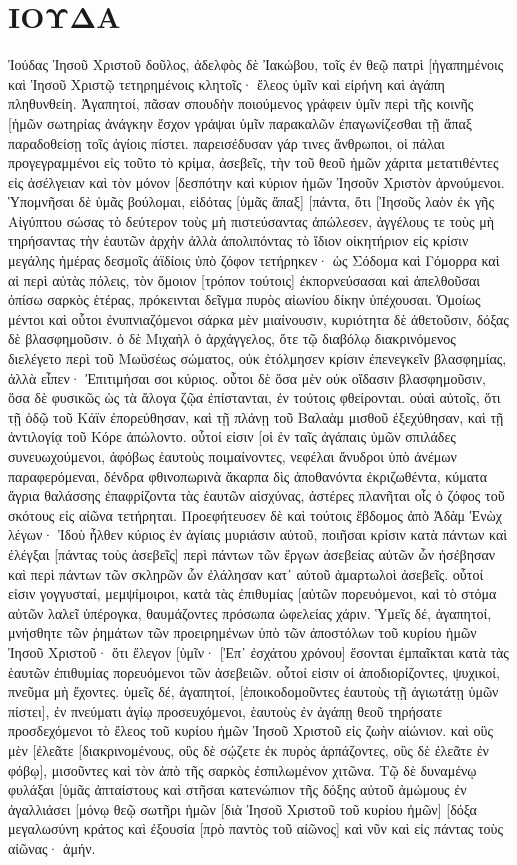 \section{ΙΟΥΔΑ}
Ἰούδας Ἰησοῦ Χριστοῦ δοῦλος, ἀδελφὸς δὲ Ἰακώβου, τοῖς ἐν θεῷ πατρὶ [ἠγαπημένοις καὶ Ἰησοῦ Χριστῷ τετηρημένοις κλητοῖς· 
ἔλεος ὑμῖν καὶ εἰρήνη καὶ ἀγάπη πληθυνθείη. 
Ἀγαπητοί, πᾶσαν σπουδὴν ποιούμενος γράφειν ὑμῖν περὶ τῆς κοινῆς [ἡμῶν σωτηρίας ἀνάγκην ἔσχον γράψαι ὑμῖν παρακαλῶν ἐπαγωνίζεσθαι τῇ ἅπαξ παραδοθείσῃ τοῖς ἁγίοις πίστει. 
παρεισέδυσαν γάρ τινες ἄνθρωποι, οἱ πάλαι προγεγραμμένοι εἰς τοῦτο τὸ κρίμα, ἀσεβεῖς, τὴν τοῦ θεοῦ ἡμῶν χάριτα μετατιθέντες εἰς ἀσέλγειαν καὶ τὸν μόνον [δεσπότην καὶ κύριον ἡμῶν Ἰησοῦν Χριστὸν ἀρνούμενοι. 
Ὑπομνῆσαι δὲ ὑμᾶς βούλομαι, εἰδότας [ὑμᾶς ἅπαξ] [πάντα, ὅτι [Ἰησοῦς λαὸν ἐκ γῆς Αἰγύπτου σώσας τὸ δεύτερον τοὺς μὴ πιστεύσαντας ἀπώλεσεν, 
ἀγγέλους τε τοὺς μὴ τηρήσαντας τὴν ἑαυτῶν ἀρχὴν ἀλλὰ ἀπολιπόντας τὸ ἴδιον οἰκητήριον εἰς κρίσιν μεγάλης ἡμέρας δεσμοῖς ἀϊδίοις ὑπὸ ζόφον τετήρηκεν· 
ὡς Σόδομα καὶ Γόμορρα καὶ αἱ περὶ αὐτὰς πόλεις, τὸν ὅμοιον [τρόπον τούτοις] ἐκπορνεύσασαι καὶ ἀπελθοῦσαι ὀπίσω σαρκὸς ἑτέρας, πρόκεινται δεῖγμα πυρὸς αἰωνίου δίκην ὑπέχουσαι. 
Ὁμοίως μέντοι καὶ οὗτοι ἐνυπνιαζόμενοι σάρκα μὲν μιαίνουσιν, κυριότητα δὲ ἀθετοῦσιν, δόξας δὲ βλασφημοῦσιν. 
ὁ δὲ Μιχαὴλ ὁ ἀρχάγγελος, ὅτε τῷ διαβόλῳ διακρινόμενος διελέγετο περὶ τοῦ Μωϋσέως σώματος, οὐκ ἐτόλμησεν κρίσιν ἐπενεγκεῖν βλασφημίας, ἀλλὰ εἶπεν· Ἐπιτιμήσαι σοι κύριος. 
οὗτοι δὲ ὅσα μὲν οὐκ οἴδασιν βλασφημοῦσιν, ὅσα δὲ φυσικῶς ὡς τὰ ἄλογα ζῷα ἐπίστανται, ἐν τούτοις φθείρονται. 
οὐαὶ αὐτοῖς, ὅτι τῇ ὁδῷ τοῦ Κάϊν ἐπορεύθησαν, καὶ τῇ πλάνῃ τοῦ Βαλαὰμ μισθοῦ ἐξεχύθησαν, καὶ τῇ ἀντιλογίᾳ τοῦ Κόρε ἀπώλοντο. 
οὗτοί εἰσιν [οἱ ἐν ταῖς ἀγάπαις ὑμῶν σπιλάδες συνευωχούμενοι, ἀφόβως ἑαυτοὺς ποιμαίνοντες, νεφέλαι ἄνυδροι ὑπὸ ἀνέμων παραφερόμεναι, δένδρα φθινοπωρινὰ ἄκαρπα δὶς ἀποθανόντα ἐκριζωθέντα, 
κύματα ἄγρια θαλάσσης ἐπαφρίζοντα τὰς ἑαυτῶν αἰσχύνας, ἀστέρες πλανῆται οἷς ὁ ζόφος τοῦ σκότους εἰς αἰῶνα τετήρηται. 
Προεφήτευσεν δὲ καὶ τούτοις ἕβδομος ἀπὸ Ἀδὰμ Ἑνὼχ λέγων· Ἰδοὺ ἦλθεν κύριος ἐν ἁγίαις μυριάσιν αὐτοῦ, 
ποιῆσαι κρίσιν κατὰ πάντων καὶ ἐλέγξαι [πάντας τοὺς ἀσεβεῖς] περὶ πάντων τῶν ἔργων ἀσεβείας αὐτῶν ὧν ἠσέβησαν καὶ περὶ πάντων τῶν σκληρῶν ὧν ἐλάλησαν κατ᾽ αὐτοῦ ἁμαρτωλοὶ ἀσεβεῖς. 
οὗτοί εἰσιν γογγυσταί, μεμψίμοιροι, κατὰ τὰς ἐπιθυμίας [αὐτῶν πορευόμενοι, καὶ τὸ στόμα αὐτῶν λαλεῖ ὑπέρογκα, θαυμάζοντες πρόσωπα ὠφελείας χάριν. 
Ὑμεῖς δέ, ἀγαπητοί, μνήσθητε τῶν ῥημάτων τῶν προειρημένων ὑπὸ τῶν ἀποστόλων τοῦ κυρίου ἡμῶν Ἰησοῦ Χριστοῦ· 
ὅτι ἔλεγον [ὑμῖν· [Ἐπ᾽ ἐσχάτου χρόνου] ἔσονται ἐμπαῖκται κατὰ τὰς ἑαυτῶν ἐπιθυμίας πορευόμενοι τῶν ἀσεβειῶν. 
οὗτοί εἰσιν οἱ ἀποδιορίζοντες, ψυχικοί, πνεῦμα μὴ ἔχοντες. 
ὑμεῖς δέ, ἀγαπητοί, [ἐποικοδομοῦντες ἑαυτοὺς τῇ ἁγιωτάτῃ ὑμῶν πίστει], ἐν πνεύματι ἁγίῳ προσευχόμενοι, 
ἑαυτοὺς ἐν ἀγάπῃ θεοῦ τηρήσατε προσδεχόμενοι τὸ ἔλεος τοῦ κυρίου ἡμῶν Ἰησοῦ Χριστοῦ εἰς ζωὴν αἰώνιον. 
καὶ οὓς μὲν [ἐλεᾶτε [διακρινομένους, 
οὓς δὲ σῴζετε ἐκ πυρὸς ἁρπάζοντες, οὓς δὲ ἐλεᾶτε ἐν φόβῳ], μισοῦντες καὶ τὸν ἀπὸ τῆς σαρκὸς ἐσπιλωμένον χιτῶνα. 
Τῷ δὲ δυναμένῳ φυλάξαι [ὑμᾶς ἀπταίστους καὶ στῆσαι κατενώπιον τῆς δόξης αὐτοῦ ἀμώμους ἐν ἀγαλλιάσει 
[μόνῳ θεῷ σωτῆρι ἡμῶν [διὰ Ἰησοῦ Χριστοῦ τοῦ κυρίου ἡμῶν] [δόξα μεγαλωσύνη κράτος καὶ ἐξουσία [πρὸ παντὸς τοῦ αἰῶνος] καὶ νῦν καὶ εἰς πάντας τοὺς αἰῶνας· ἀμήν. 
